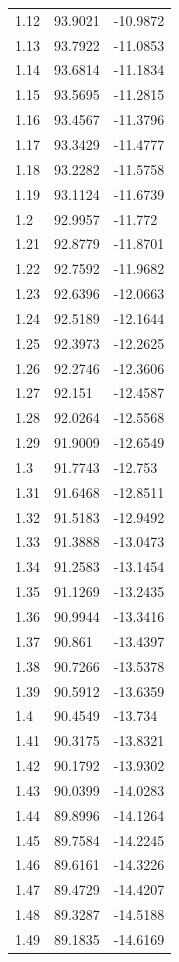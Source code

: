\begin{table}
\begin{tabular}{lll}
1.12 & 93.9021 & -10.9872 \\
1.13 & 93.7922 & -11.0853 \\
1.14 & 93.6814 & -11.1834 \\
1.15 & 93.5695 & -11.2815 \\
1.16 & 93.4567 & -11.3796 \\
1.17 & 93.3429 & -11.4777 \\
1.18 & 93.2282 & -11.5758 \\
1.19 & 93.1124 & -11.6739 \\
1.2 & 92.9957 & -11.772 \\
1.21 & 92.8779 & -11.8701 \\
1.22 & 92.7592 & -11.9682 \\
1.23 & 92.6396 & -12.0663 \\
1.24 & 92.5189 & -12.1644 \\
1.25 & 92.3973 & -12.2625 \\
1.26 & 92.2746 & -12.3606 \\
1.27 & 92.151 & -12.4587 \\
1.28 & 92.0264 & -12.5568 \\
1.29 & 91.9009 & -12.6549 \\
1.3 & 91.7743 & -12.753 \\
1.31 & 91.6468 & -12.8511 \\
1.32 & 91.5183 & -12.9492 \\
1.33 & 91.3888 & -13.0473 \\
1.34 & 91.2583 & -13.1454 \\
1.35 & 91.1269 & -13.2435 \\
1.36 & 90.9944 & -13.3416 \\
1.37 & 90.861 & -13.4397 \\
1.38 & 90.7266 & -13.5378 \\
1.39 & 90.5912 & -13.6359 \\
1.4 & 90.4549 & -13.734 \\
1.41 & 90.3175 & -13.8321 \\
1.42 & 90.1792 & -13.9302 \\
1.43 & 90.0399 & -14.0283 \\
1.44 & 89.8996 & -14.1264 \\
1.45 & 89.7584 & -14.2245 \\
1.46 & 89.6161 & -14.3226 \\
1.47 & 89.4729 & -14.4207 \\
1.48 & 89.3287 & -14.5188 \\
1.49 & 89.1835 & -14.6169 \\

\end{tabular}
\end{table}
